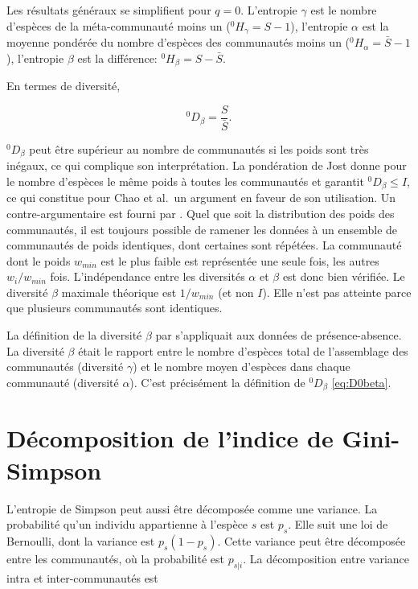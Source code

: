 \documentclass[
  11pt,
  french,
  a4paper,
  extrafontsizes,onecolumn,openright
  ]{memoir}
\begin{document}
Les résultats généraux se simplifient pour \(q=0\).
L'entropie \(\gamma\) est le nombre d'espèces de la méta-communauté moins un (\(^{0}\!H_{\gamma}=S-1\)), l'entropie \(\alpha\) est la moyenne pondérée du nombre d'espèces des communautés moins un (\(^{0}\!H_{\alpha}=\bar{S}-1\)), l'entropie \(\beta\) est la différence: \(^{0}\!H_{\beta}=S-\bar{S}\).

En termes de diversité,

\begin{equation}
  \label{eq:D0beta}
  ^{0}\!D_{\beta}=\frac{S}{\bar{S}}.
\end{equation}

\(^{0}\!D_{\beta}\) peut être supérieur au nombre de communautés \autocite{Chao2012a} si les poids sont très inégaux, ce qui complique son interprétation.
La pondération de Jost donne pour le nombre d'espèces le même poids à toutes les communautés et garantit \(^{0}\!D_{\beta}\le I\), ce qui constitue pour Chao et al.~un argument en faveur de son utilisation.
Un contre-argumentaire est fourni par \textcite{Marcon2014a}.
Quel que soit la distribution des poids des communautés, il est toujours possible de ramener les données à un ensemble de communautés de poids identiques, dont certaines sont répétées.
La communauté dont le poids \(w_{min}\) est le plus faible est représentée une seule fois, les autres \({w_i}/{w_{min}}\) fois.
L'indépendance entre les diversités \(\alpha\) et \(\beta\) est donc bien vérifiée.
Le diversité \(\beta\) maximale théorique est \({1}/{w_{min}}\) (et non \(I\)).
Elle n'est pas atteinte parce que plusieurs communautés sont identiques.

La définition de la diversité \(\beta\) par \textcite{Whittaker1960} s'appliquait aux données de présence-absence.
La diversité \(\beta\) était le rapport entre le nombre d'espèces total de l'assemblage des communautés (diversité \(\gamma\)) et le nombre moyen d'espèces dans chaque communauté (diversité \(\alpha\)).
C'est précisément la définition de \(^{0}\!D_{\beta}\) \eqref{eq:D0beta}.

\section{Décomposition de l'indice de Gini-Simpson}\label{duxe9composition-de-lindice-de-gini-simpson}

L'entropie de Simpson peut aussi être décomposée comme une variance.
La probabilité qu'un individu appartienne à l'espèce \(s\) est \(p_s\).
Elle suit une loi de Bernoulli, dont la variance est \(p_s\left(1-p_s\right)\).
Cette variance peut être décomposée entre les communautés, où la probabilité est \(p_{s|i}\).
La décomposition entre variance intra et inter-communautés est
\end{document}
